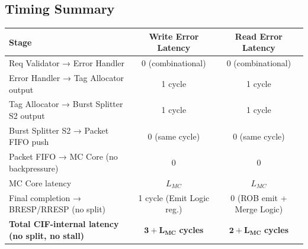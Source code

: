 \subsection{Timing Summary}

\begin{center}
\begin{tabularx}{\textwidth}{L{8cm}cc}
\toprule
\textbf{Stage} & \textbf{Write Error Latency} & \textbf{Read Error Latency} \\
\midrule
Req Validator → Error Handler & 0 (combinational) & 0 (combinational) \\
Error Handler → Tag Allocator output & 1 cycle & 1 cycle \\
Tag Allocator → Burst Splitter S2 output & 1 cycle & 1 cycle \\
Burst Splitter S2 → Packet FIFO push & 0 (same cycle) & 0 (same cycle) \\
Packet FIFO → MC Core (no backpressure) & 0 & 0 \\
MC Core latency & $L_{MC}$ & $L_{MC}$ \\
Final completion → BRESP/RRESP (no split) & 1 cycle (Emit Logic reg.) & 0 (ROB emit + Merge Logic) \\
\midrule
\textbf{Total CIF-internal latency (no split, no stall)} & $\mathbf{3 + L_{MC}}$ \textbf{cycles} & $\mathbf{2 + L_{MC}}$ \textbf{cycles} \\
\bottomrule
\end{tabularx}
\end{center}